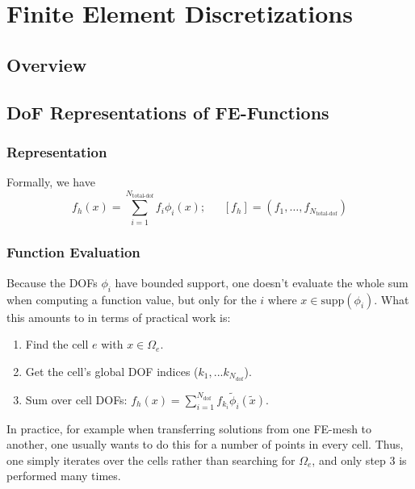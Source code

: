 
\chapter{Finite Element Discretizations}


\section{Overview}
\label{sec:fem-overview}


\section{DoF Representations of FE-Functions}

\subsection{Representation}
\newcommand{\coef}[2]{{#1}_{#2}}
\newcommand{\Ntotdof}{{N_{\text{total-dof}}}}
\newcommand{\Ndofspercell}{{N_{\text{dof}}}}
\newcommand{\representation}[1]{\left[#1\right]}
\newcommand{\support}[1]{\text{supp}\left(#1\right)}
\newcommand{\inner}[2]{\left\langle #1\middle|#2\right\rangle}
\renewcommand{\vec}[1]{\mathbf{#1}}
\newcommand{\mat}[1]{\mathbf{#1}}

Formally, we have
\begin{equation}
  f_h(x) = \sum_{i=1}^\Ntotdof \coef{f}{i} \phi_i(x); 
  \ \ \ \ \ \ \
  \representation{f_h} = (\coef{f}{1},\ldots,\coef{f}{\Ntotdof})
\end{equation}

\subsection{Function Evaluation}
Because the DOFs $\phi_i$ have bounded support, one doesn't evaluate the whole
sum when computing a function value, but only for the $i$ where $x\in\support{\phi_i}$. 
What this amounts to in terms of practical work is:
\begin{enumerate}
\item Find the cell $e$ with $x\in\Omega_e$.
\item Get the cell's global DOF indices (${k_1},...{k_\Ndofspercell}$).
\item Sum over cell DOFs: $f_h(x) = \sum_{i=1}^\Ndofspercell f_{k_i} \tilde{\phi}_i(\tilde{x})$.
\end{enumerate}
In practice, for example when transferring solutions from one FE-mesh
to another, one usually wants to do this for a number of points in every
cell. Thus, one simply iterates over the cells rather than searching for $\Omega_e$, 
and only step 3 is performed many times. 

